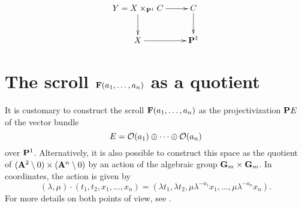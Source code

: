 \[\xymatrix{
  Y = X \x_{\Pbb^1} C \ar[r] \ar[d] & C \ar[d] \\
  X \ar[r] & \Pbb^1
}\]


\section{The scroll $\mathbf{F}(a_1, \dots, a_n)$ as a quotient}

It is customary to construct the scroll $\mathbf{F}(a_1, \dots, a_n)$ as the projectivization $\mathbf{P} E$ of the vector bundle
\[
E = \mathcal{O}(a_1) \oplus \cdots \oplus \mathcal{O}(a_n)
\]
over $\mathbf{P}^1$. Alternatively, it is also possible to construct this space as the quotient of $(\mathbf{A}^2 \setminus 0) \times (\mathbf{A}^n \setminus 0)$ by an action of the algebraic group $\mathbf{G}_m \times \mathbf{G}_m$. In coordinates, the action is given by
\[
(\lambda, \mu) \cdot (t_1, t_2, x_1, \dots, x_n) =
(\lambda t_1, \lambda t_2, \mu \lambda^{-a_1} x_1, \dots, \mu \lambda^{-a_n} x_n).
\]
For more details on both points of view, see \cite[Chapter 2]{Reid-surfaces}.


